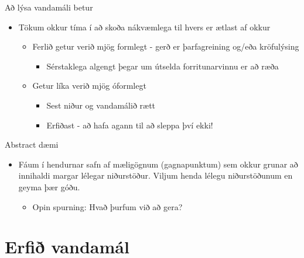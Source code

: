 \documentclass{beamer}
\begin{document}
\begin{frame}{Að lýsa vandamáli betur}
\begin{itemize}
 \item Tökum okkur tíma í að skoða nákvæmlega til hvers er ætlast af okkur
 \begin{itemize}
  \item Ferlið getur verið mjög formlegt - gerð er þarfagreining og/eða kröfulýsing
  \begin{itemize}
   \item Sérstaklega algengt þegar um útselda forritunarvinnu er að ræða
  \end{itemize}
  \item Getur líka verið mjög óformlegt
  \begin{itemize}
   \item Sest niður og vandamálið rætt
   \item Erfiðast - að hafa agann til að sleppa því ekki!
  \end{itemize}
 \end{itemize}
\end{itemize}
\end{frame}

\begin{frame}{Abstract dæmi}
\begin{itemize}
 \item Fáum í hendurnar safn af mæligögnum (gagnapunktum) sem okkur grunar að innihaldi margar lélegar niðurstöður. Viljum henda lélegu niðurstöðunum en geyma þær góðu.
 \begin{itemize}
  \item Opin spurning: Hvað þurfum við að gera?
 \end{itemize}
\end{itemize}
\end{frame}

\section{Erfið vandamál}
\end{document}
